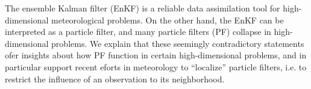 The ensemble Kalman filter (EnKF) is a reliable data assimilation tool
for high-dimensional meteorological problems. On the other hand,
the EnKF can be interpreted as a particle filter, and many particle
filters (PF) collapse in high-dimensional problems. We explain that
these seemingly contradictory statements ofer insights about how PF
function in certain high-dimensional problems, and in particular
support recent eforts in meteorology to ``localize'' particle filters, i.e.
to restrict the influence of an observation to its neighborhood.